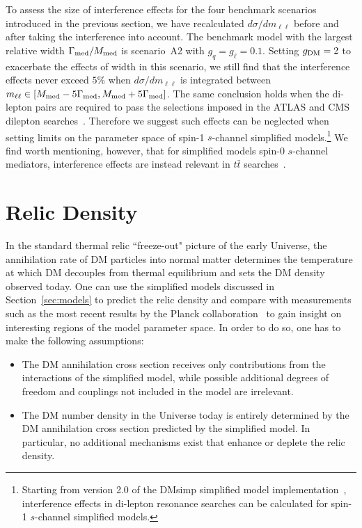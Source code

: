 \documentclass[review]{elsarticle}
\begin{document}
To assess the size of interference effects for the four benchmark scenarios introduced in the previous section, we have recalculated  $d \sigma/d m_{\ell \ell}$ before and after taking the interference into account. The benchmark model with the largest relative width $\Gamma_{\rm med}/M_{\rm med}$ is 
scenario~A2 with $g_q=g_\ell =0.1$. Setting $g_{\rm DM} = 2$ to exacerbate the effects of width in this scenario, we still find that the interference effects never exceed $5\%$ when $d \sigma/d m_{\ell \ell}$ is integrated between $m_{\ell \ell} \in [M_{\rm med}-5 \Gamma_{\rm med}, M_{\rm med}+5 \Gamma_{\rm med}]$. The same conclusion holds when the di-lepton pairs are required to pass the selections imposed in the ATLAS and CMS dilepton searches~\cite{Aaboud:2016cth,Khachatryan:2016zqb}. Therefore we suggest such effects can be neglected when setting limits on the parameter space of spin-1 $s$-channel simplified models.\footnote{Starting from version 2.0 of the {\sc DMsimp} simplified model implementation~\cite{DMsimp}, interference effects in di-lepton resonance searches can be calculated for spin-1 $s$-channel simplified models.} We find worth mentioning, however, that for simplified models 
spin-0 $s$-channel mediators, interference effects are instead relevant in $t\bar{t}$ searches~\cite{Dicus:1994bm,Frederix:2007gi,Djouadi:2015jea,Craig:2015jba,Jung:2015gta,Bernreuther:2015fts,Gori:2016zto,Carena:2016npr,Aaboud:2017hnm,Bauer:2017ota}.

\section{Relic Density}
\label{sec:relic}

In the standard thermal relic ``freeze-out" picture of the early Universe,
the annihilation rate of DM particles into normal matter determines the temperature at which DM decouples from thermal equilibrium and sets the DM density observed today.
One can use the simplified models discussed in Section~\ref{sec:models} to predict the relic density and compare with measurements such as the most recent results by the Planck collaboration~\cite{Ade:2015xua} to gain insight on interesting regions of the model parameter space. In order to do so, one has to make the following assumptions:
\begin{itemize}
\item The DM annihilation cross section receives only contributions from the interactions of the simplified model, while possible additional degrees of freedom and couplings not included in the model are irrelevant. 
\item The DM number density in the Universe today is entirely determined by  the DM annihilation cross section predicted by the simplified model. In particular, no additional mechanisms exist that enhance or deplete the relic density.
\end{itemize}
\end{document}
